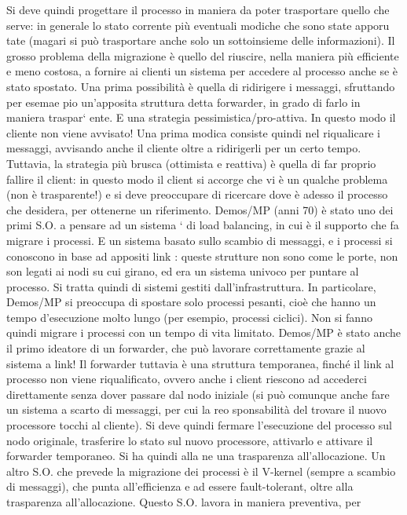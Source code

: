 Si deve quindi progettare il processo in maniera da poter trasportare quello che
serve: in generale lo stato corrente più eventuali modiche che sono state apporu
tate (magari si può trasportare anche solo un sottoinsieme delle informazioni).
Il grosso problema della migrazione è quello del riuscire, nella maniera più
efficiente e meno costosa, a fornire ai clienti un sistema per accedere al processo
anche se è stato spostato.
Una prima possibilità è quella di ridirigere i messaggi, sfruttando per esemae
pio un'apposita struttura detta forwarder, in grado di farlo in maniera traspar`
ente. E una strategia pessimistica/pro-attiva. In questo modo il cliente non
viene avvisato! Una prima modica consiste quindi nel riqualicare i messaggi,
avvisando anche il cliente oltre a ridirigerli per un certo tempo.
Tuttavia, la strategia più brusca (ottimista e reattiva) è quella di far proprio
fallire il client: in questo modo il client si accorge che vi è un qualche problema
(non è trasparente!) e si deve preoccupare di ricercare dove è adesso il processo
che desidera, per ottenerne un riferimento.
Demos/MP (anni 70) è stato uno dei primi S.O. a pensare ad un sistema
`
di load balancing, in cui è il supporto che fa migrare i processi. E un sistema
basato sullo scambio di messaggi, e i processi si conoscono in base ad appositi
link : queste strutture non sono come le porte, non son legati ai nodi su cui
girano, ed era un sistema univoco per puntare al processo. Si tratta quindi di
sistemi gestiti dall'infrastruttura.
In particolare, Demos/MP si preoccupa di spostare solo processi pesanti, cioè
che hanno un tempo d'esecuzione molto lungo (per esempio, processi ciclici).
Non si fanno quindi migrare i processi con un tempo di vita limitato.
Demos/MP è stato anche il primo ideatore di un forwarder, che può lavorare
correttamente grazie al sistema a link! Il forwarder tuttavia è una struttura
temporanea, finché il link al processo non viene riqualificato, ovvero anche i
client riescono ad accederci direttamente senza dover passare dal nodo iniziale
(si può comunque anche fare un sistema a scarto di messaggi, per cui la reo
sponsabilità del trovare il nuovo processore tocchi al cliente). Si deve quindi
fermare l'esecuzione del processo sul nodo originale, trasferire lo stato sul nuovo
processore, attivarlo e attivare il forwarder temporaneo. Si ha quindi alla ne
una trasparenza all'allocazione.
Un altro S.O. che prevede la migrazione dei processi è il V-kernel (sempre
a scambio di messaggi), che punta all'efficienza e ad essere fault-tolerant, oltre
alla trasparenza all'allocazione. Questo S.O. lavora in maniera preventiva, per
